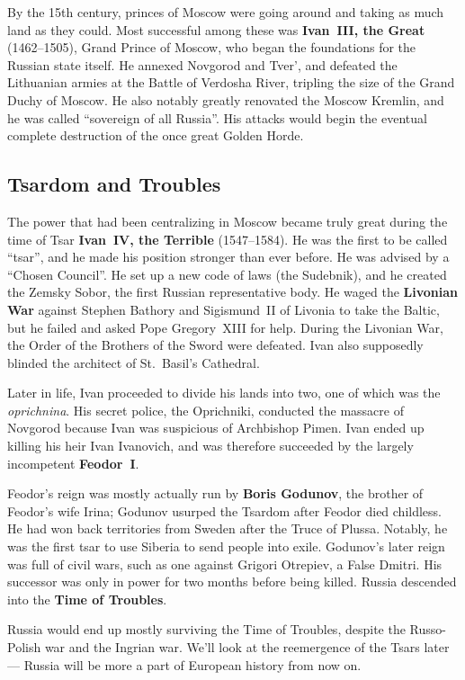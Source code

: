 By the 15th century, princes of Moscow were going around and taking as much land as they could.
Most successful among these was \textbf{Ivan~III, the Great} (1462--1505), Grand Prince of Moscow,
who began the foundations for the Russian state itself.
He annexed Novgorod and Tver', and defeated the Lithuanian armies at the Battle of Verdosha River,
tripling the size of the Grand Duchy of Moscow.
He also notably greatly renovated the Moscow Kremlin, and he was called ``sovereign of all Russia''.
His attacks would begin the eventual complete destruction of the once great Golden Horde.

\subsection*{Tsardom and Troubles}

The power that had been centralizing in Moscow became truly great during the time of
Tsar \textbf{Ivan~IV, the Terrible} (1547--1584).
He was the first to be called ``tsar'', and he made his position stronger than ever before.
He was advised by a ``Chosen Council''.
He set up a new code of laws (the Sudebnik),
and he created the Zemsky Sobor, the first Russian representative body.
He waged the \textbf{Livonian War}
against Stephen Bathory and Sigismund~II of Livonia to take the Baltic,
but he failed and asked Pope Gregory~XIII for help.
During the Livonian War, the Order of the Brothers of the Sword were defeated.
Ivan also supposedly blinded the architect of St.\ Basil's Cathedral.

Later in life,
Ivan proceeded to divide his lands into two, one of which was the \textit{oprichnina}.
His secret police, the Oprichniki,
conducted the massacre of Novgorod because Ivan was suspicious of Archbishop Pimen.
Ivan ended up killing his heir Ivan Ivanovich,
and was therefore succeeded by the largely incompetent \textbf{Feodor~I}.

Feodor's reign was mostly actually run by \textbf{Boris Godunov},
the brother of Feodor's wife Irina;
Godunov usurped the Tsardom after Feodor died childless.
He had won back territories from Sweden after the Truce of Plussa.
Notably, he was the first tsar to use Siberia to send people into exile.
Godunov's later reign was full of civil wars, such as one against Grigori Otrepiev, a False Dmitri.
His successor was only in power for two months before being killed.
Russia descended into the \textbf{Time of Troubles}.

Russia would end up mostly surviving the Time of Troubles,
despite the Russo-Polish war and the Ingrian war.
We'll look at the reemergence of the Tsars later ---
Russia will be more a part of European history from now on.

